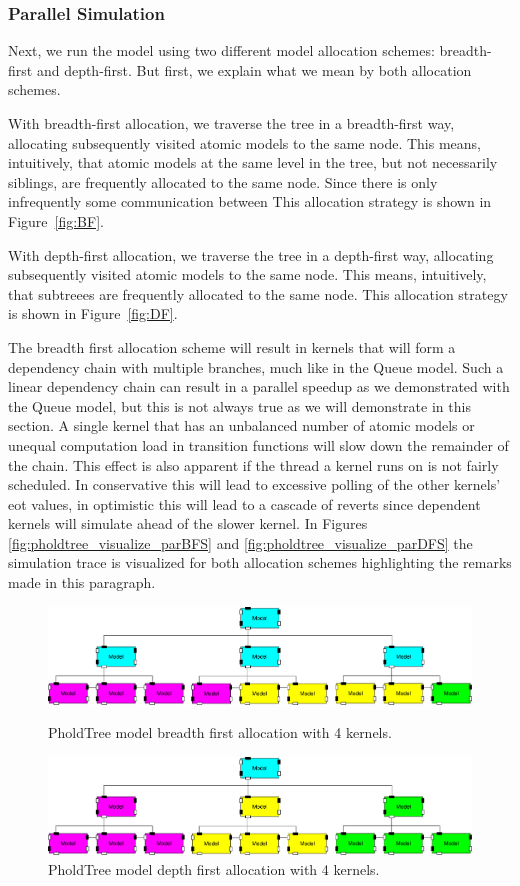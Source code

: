 \subsubsection{Parallel Simulation}
Next, we run the model using two different model allocation schemes: breadth-first and depth-first.
But first, we explain what we mean by both allocation schemes.

With breadth-first allocation, we traverse the tree in a breadth-first way, allocating subsequently visited atomic models to the same node.
This means, intuitively, that atomic models at the same level in the tree, but not necessarily siblings, are frequently allocated to the same node.
Since there is only infrequently some communication between 
This allocation strategy is shown in Figure~\ref{fig:BF}.

With depth-first allocation, we traverse the tree in a depth-first way, allocating subsequently visited atomic models to the same node.
This means, intuitively, that subtreees are frequently allocated to the same node.
This allocation strategy is shown in Figure~\ref{fig:DF}.

The breadth first allocation scheme will result in kernels that will form a dependency chain with multiple branches, much like in the Queue model.
Such a linear dependency chain can result in a parallel speedup as we demonstrated with the Queue model, but this is not always true as we will demonstrate in this section.
A single kernel that has an unbalanced number of atomic models or unequal computation load in transition functions will slow down the remainder of the chain. This effect is also apparent if the thread a kernel runs on is not fairly scheduled. In conservative this will lead to excessive polling of the other kernels' eot values, in optimistic this will lead to a cascade of reverts since dependent kernels will simulate ahead of the slower kernel. In Figures \ref{fig:pholdtree_visualize_parBFS} and \ref{fig:pholdtree_visualize_parDFS} the simulation trace is visualized for both allocation schemes highlighting the remarks made in this paragraph.
\begin{figure}
   \center
   
   \includegraphics[width=\textwidth]{fig/pholdtree_alloc_BF.pdf}
   \caption{PholdTree model breadth first allocation with 4 kernels.}
   \label{fig:PholdTree_model_bfs}
   \includegraphics[width=\textwidth]{fig/pholdtree_alloc_DF.pdf}
   \caption{PholdTree model depth first allocation with 4 kernels.}
   \label{fig:PholdTree_model_dfs}
\end{figure}

